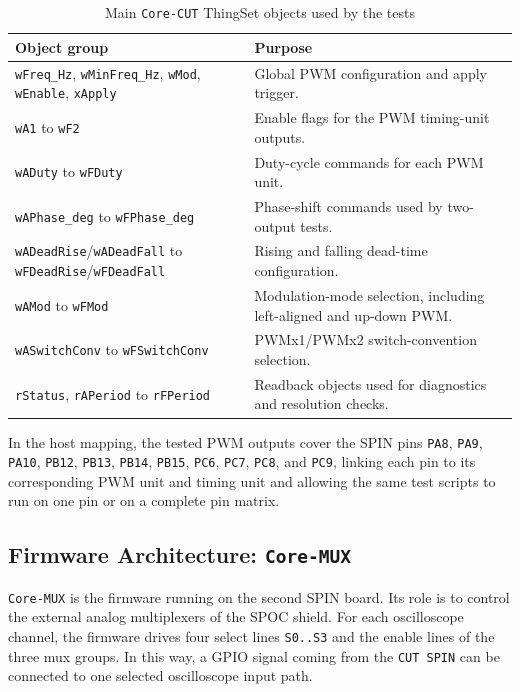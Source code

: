 \begin{table}[H]
\centering
\caption{Main \texttt{Core-CUT} ThingSet objects used by the tests}
\label{tab:core_cut_thingset_objects}
\small
\begin{tabularx}{\textwidth}{|p{4.5cm}|X|}
\hline
\textbf{Object group} & \textbf{Purpose} \\ \hline
\texttt{wFreq\_Hz}, \texttt{wMinFreq\_Hz}, \texttt{wMod}, \texttt{wEnable}, \texttt{xApply} & Global PWM configuration and apply trigger. \\ \hline
\texttt{wA1} to \texttt{wF2} & Enable flags for the PWM timing-unit outputs. \\ \hline
\texttt{wADuty} to \texttt{wFDuty} & Duty-cycle commands for each PWM unit. \\ \hline
\texttt{wAPhase\_deg} to \texttt{wFPhase\_deg} & Phase-shift commands used by two-output tests. \\ \hline
\texttt{wADeadRise}/\texttt{wADeadFall} to \texttt{wFDeadRise}/\texttt{wFDeadFall} & Rising and falling dead-time configuration. \\ \hline
\texttt{wAMod} to \texttt{wFMod} & Modulation-mode selection, including left-aligned and up-down PWM. \\ \hline
\texttt{wASwitchConv} to \texttt{wFSwitchConv} & PWMx1/PWMx2 switch-convention selection. \\ \hline
\texttt{rStatus}, \texttt{rAPeriod} to \texttt{rFPeriod} & Readback objects used for diagnostics and resolution checks. \\ \hline
\end{tabularx}
\normalsize
\end{table}

In the host mapping, the tested PWM outputs cover the SPIN pins
\texttt{PA8}, \texttt{PA9}, \texttt{PA10}, \texttt{PB12},
\texttt{PB13}, \texttt{PB14}, \texttt{PB15}, \texttt{PC6},
\texttt{PC7}, \texttt{PC8}, and \texttt{PC9}, linking each pin to its
corresponding PWM unit and timing unit and allowing the same test
scripts to run on one pin or on a complete pin matrix.


\subsection{Firmware Architecture: \texttt{Core-MUX}}
\label{firmware-architecture-core-mux}

\texttt{Core-MUX} is the firmware running on the second SPIN board. Its
role is to control the external analog multiplexers of the SPOC shield.
For each oscilloscope channel, the firmware drives four select lines
\texttt{S0..S3} and the enable lines of the three mux groups. In this
way, a GPIO signal coming from the \texttt{CUT SPIN} can be connected to
one selected oscilloscope input path.

